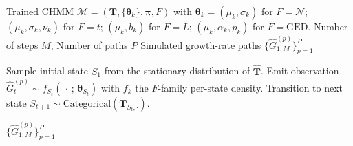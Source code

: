 
\begin{algorithm}[tp]
\caption{CHMM simulation of synthetic excess growth rate paths (unified four-family framework). The emission draw at line~\ref{line:simemit} branches on the family $F \in \{\mathcal{N}, t, L, \text{GED}\}$ exactly as in Algorithm~\ref{alg:chmm_em}: $\mathcal{N}(\mu_k, \sigma_k^2)$ for CHMM-N, $t_{\nu_k}(\mu_k, \sigma_k)$ for CHMM-t, $\mathrm{Laplace}(\mu_k, b_k)$ for CHMM-L, $\mathrm{GED}(\mu_k, \alpha_k, p_k)$ for CHMM-GED; the latent chain and transition step are shared.}
\label{alg:chmm_simulate}
\small
\begin{algorithmic}[1]
\REQUIRE Trained CHMM $\mathcal{M} = (\mathbf{T}, \{\boldsymbol\theta_k\}, \boldsymbol{\pi}, F)$ with $\boldsymbol\theta_k = (\mu_k, \sigma_k)$ for $F = \mathcal{N}$; $(\mu_k, \sigma_k, \nu_k)$ for $F = t$; $(\mu_k, b_k)$ for $F = L$; $(\mu_k, \alpha_k, p_k)$ for $F = \mathrm{GED}$. Number of steps $M$, Number of paths $P$
\ENSURE Simulated growth-rate paths $\{\hat{G}^{(p)}_{1:M}\}_{p=1}^{P}$

    \STATE Sample initial state $S_1$ from the stationary distribution of $\hat{\mathbf T}$.
        \STATE Emit observation $\hat{G}_t^{(p)} \sim f_{S_t}(\,\cdot\,;\, \boldsymbol\theta_{S_t})$ with $f_k$ the $F$-family per-state density. \label{line:simemit}
            \STATE Transition to next state $S_{t+1} \sim \text{Categorical}(\mathbf{T}_{S_t, \cdot})$.
        \ENDIF
    \ENDFOR
\ENDFOR

\RETURN $\{\hat{G}^{(p)}_{1:M}\}_{p=1}^{P}$
\end{algorithmic}
\end{algorithm}

